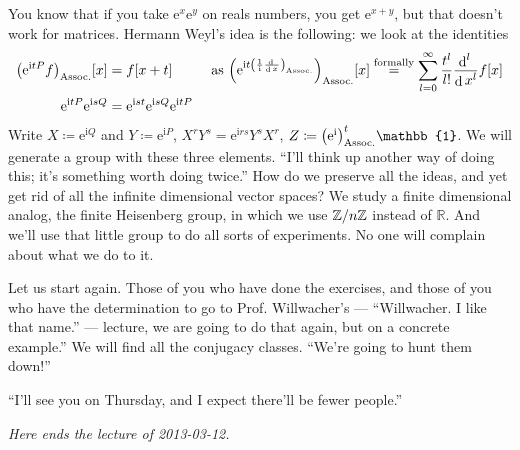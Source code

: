 \documentclass[10pt]{article}
\DeclarePairedDelimiter\parentheses{\lparen}{\rparen}
\DeclarePairedDelimiter\squareBrackets{[}{]}
\newcommand\I{\mathrm{i}}
\newcommand\E{\mathrm{e}}
\DeclareMathOperator{\diffd}{d}
\newcommand\deriv[3][]{\frac{\diffd^{#1} {#3}}{{\diffd {#2}}^{#1}}}
\newcommand{\derivop}[2][]{\deriv[#1]{#2}{}}
\newcommand{\Z}[1][]{\ifstrempty{#1}{\mathbb{Z}}{\mathbb{Z}/{#1}\mathbb{Z}}}
\newcommand{\R}{\mathbb{R}}
\newcommand\of[1]{\parentheses*{#1}}
\newcommand\pa[1]{\parentheses*{#1}}
\newcommand{\Identity}{\mathbb{1}}
\renewcommand\pa[1]{\parentheses*{#1}_\mathrm{Assoc.}}
\renewcommand\of[1]{\squareBrackets*{#1}}
\newcommand{\lectureEnd}[1]{

\emph{Here ends the lecture of #1.}

}
\begin{document}
You know that if you take $\E^x\E^y$ on reals numbers, you get $\E^{x+y}$, but that doesn't work for matrices. Hermann Weyl's idea is the following: we look at the identities \begin{align*}
\pa{\E^{\I t P} f}\of x &= f\of{x+t}
&&\text{ as }\pa{\E^{\I t \pa{\frac{1}{\I}\derivop x}}}\of x \overset{\text{formally}}{=} \sum{l=0}[\infty]\frac{t^l}{l!}\derivop[l] x f \of x\\
\E^{\I t P}\E^{\I s Q} &= \E^{\I s t} \E^{\I s Q} \E^{\I t P}
\end{align*}
Write $X \coloneqq \E^{\I Q}$ and $Y \coloneqq \E^{\I P}$, $X^r Y^s = \E^{\I r s} Y^s X^r$, $Z \coloneqq \pa{\E^\I}^t \Identity$. We will generate a group with these three elements. ``I'll think up another way of doing this; it's something worth doing twice.'' How do we preserve all the ideas, and yet get rid of all the infinite dimensional vector spaces? We study a finite dimensional analog, the finite Heisenberg group, in which we use $\Z[n]$ instead of $\R$. And we'll use that little group to do all sorts of experiments. No one will complain about what we do to it. 

Let us start again. Those of you who have done the exercises, and those of you who have the determination to go to Prof. Willwacher's --- ``Willwacher. I like that name.'' --- lecture, we are going to do that again, but on a concrete example.''
We will find all the conjugacy classes. ``We're going to hunt them down!'' 

``I'll see you on Thursday, and I expect there'll be fewer people.''
\lectureEnd{2013-03-12}
\end{document}
